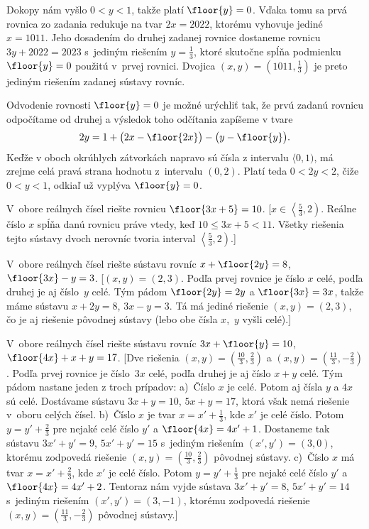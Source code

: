 {Dokopy nám vyšlo $0<y<1$, takže platí $\floor{y}=0$.
Vďaka tomu sa prvá rovnica zo zadania redukuje na tvar $2x=2022$,
ktorému vyhovuje jediné $x=1011$. Jeho dosadením do druhej
zadanej rovnice dostaneme rovnicu $3y+2022=2023$
s~jediným riešením $y=\frac13$, ktoré skutočne
spĺňa podmienku $\floor{y}=0$ použitú v~prvej rovnici.
Dvojica $(x,y) = (1011,\frac13)$ je preto jediným riešením
zadanej sústavy rovníc.

   \Pozn
Odvodenie rovnosti $\floor{y}=0$ je možné urýchliť tak, že
prvú zadanú rovnicu odpočítame od druhej a výsledok toho odčítania
zapíšeme v tvare
$$
2y=1+\bigl(2x-\floor{2x}\bigr)-\bigl(y-\floor{y}\bigr).
$$
Keďže v oboch okrúhlych zátvorkách napravo sú čísla z intervalu
$\langle0,1)$, má zrejme celá pravá strana hodnotu z~intervalu $(0,2)$.
Platí teda $0<2y<2$, čiže $0<y<1$, odkiaľ už vyplýva $\floor{y}=0$.

V~obore reálnych čísel riešte rovnicu $\floor{3x+5} = 10$.
[$x\in\left\langle\frac53, 2\right)$. Reálne číslo $x$ spĺňa danú
rovnicu práve vtedy, keď $10\leq 3x+5 < 11$. Všetky riešenia tejto sústavy
dvoch nerovníc tvoria interval $\left\langle\frac53, 2\right)$.]

V~obore reálnych čísel riešte sústavu rovníc $x + \floor{2y} =
8$, $\floor{3x}-y = 3$.
[$(x, y) = (2,3)$. Podľa prvej rovnice je číslo $x$ celé,
podľa druhej je aj číslo~$y$ celé. Tým pádom $\floor{2y}=2y$
a $\floor{3x}=3x$, takže máme sústavu $x+2y=8$, $3x-y=3$.
Tá má jediné riešenie $(x, y) = (2,3)$, čo je aj riešenie pôvodnej sústavy (lebo obe čísla $x$,~$y$ vyšli celé).]

\D
V~obore reálnych čísel riešte sústavu rovníc $3x + \floor{y} =
10$, $\floor{4x} + x + y = 17$.
[Dve riešenia $(x,y)=\left(\frac{10}{3},\frac23\right)$ a
$(x,y)=\left(\frac{11}{3}, -\frac23\right)$.
Podľa prvej rovnice je číslo~$3x$ celé, podľa druhej je
aj číslo $x+y$ celé. Tým pádom nastane jeden z troch prípadov:
a)~Číslo $x$ je celé. Potom aj čísla $y$ a $4x$ sú celé. Dostávame sústavu
$3x+y=10$, $5x+y=17$, ktorá však nemá riešenie v~oboru celých čísel.
b)~Číslo $x$ je tvar $x = x'+\frac13$, kde $x'$ je celé číslo. Potom
$y=y'+\frac23$ pre nejaké celé číslo $y'$ a $\floor{4x}=4x'+1$.
Dostaneme tak sústavu $3x'+y'=9$, $5x'+y'=15$ s~jediným riešením
$(x',y')=(3,0)$, ktorému zodpovedá riešenie
$(x, y)=\left(\frac{10}{3},\frac23\right)$
pôvodnej sústavy.
c)~Číslo $x$ má tvar $x = x'+\frac23$, kde $x'$ je celé číslo. Potom
$y=y'+\frac13$ pre nejaké celé číslo $y'$ a $\floor{4x}=4x'+2$. Tentoraz
nám vyjde sústava $3x'+y'=8$, $5x'+y'=14$ s~jediným riešením $(x', y')=(3, {-1})$,
ktorému zodpovedá riešenie $(x, y)=\left(\frac{11}{3}, {-\frac23}\right)$
pôvodnej sústavy.]

}
